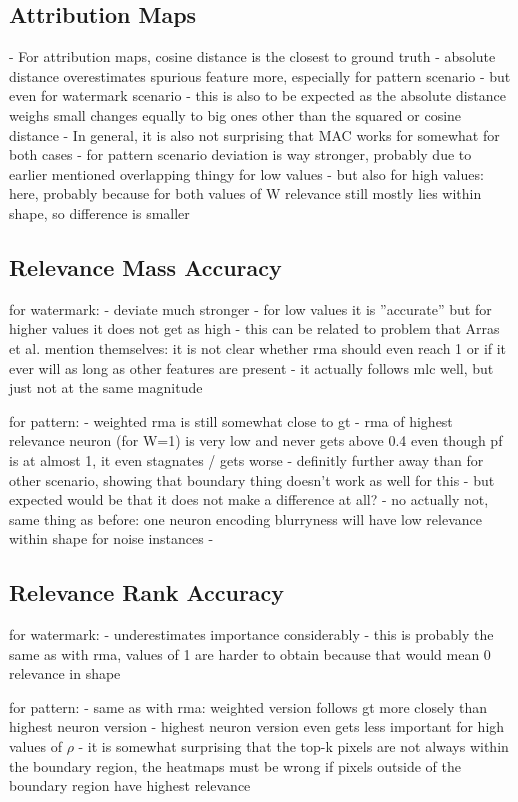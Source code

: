 \subsection{Attribution Maps}
- For attribution maps, cosine distance is the closest to ground truth
- absolute distance overestimates spurious feature more, especially for pattern scenario
- but even for watermark scenario
- this is also to be expected as the absolute distance weighs small changes equally to big ones other than the squared or cosine distance
- In general, it is also not surprising that MAC works for somewhat for both cases
- for pattern scenario deviation is way stronger, probably due to earlier mentioned overlapping thingy for low values
- but also for high values: here, probably because for both values of W relevance still mostly lies within shape, so difference is smaller

\subsection{Relevance Mass Accuracy}
for watermark:
- deviate much stronger
- for low values it is ''accurate'' but for higher values it does not get as high
- this can be related to problem that Arras et al. \cite{Arras2022} mention themselves: it is not clear whether rma should even reach 1 or if it ever will as long as other features are present
- it actually follows mlc well, but just not at the same magnitude

for pattern:
- weighted rma is still somewhat close to gt
- rma of highest relevance neuron (for W=1) is very low and never gets above 0.4 even though pf is at almost 1, it even stagnates / gets worse
- definitly further away than for other scenario, showing that boundary thing doesn't work as well for this
- but expected would be that it does not make a difference at all?
- no actually not, same thing as before: one neuron encoding blurryness will have low relevance within shape for noise instances
- 
\subsection{Relevance Rank Accuracy}
for watermark:
- underestimates importance considerably
- this is probably the same as with rma, values of 1 are harder to obtain because that would mean 0 relevance in shape

for pattern:
- same as with rma: weighted version follows gt more closely than highest neuron version
- highest neuron version even gets less important for high values of $\rho$
- it is somewhat surprising that the top-k pixels are not always within the boundary region, the heatmaps must be wrong if pixels outside of the boundary region have highest relevance

